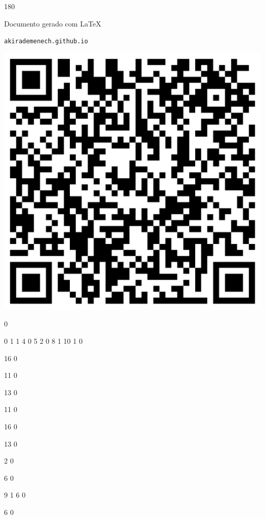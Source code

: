 \documentclass[12pt]{article}
\begin{document}
	\begin{turn}{180}	
		\begin{minipage}{\textwidth}		  
		  Documento gerado com \LaTeX			
		  
		  \texttt{akirademenech.github.io}

		  \includegraphics[height=0.3\textheight]{2e-2.pdf}

		\end{minipage}	
	\end{turn}  
		  
		\vfill  
		  
{
	0	%

	0	%
	1	%
	1	%
	4	%
	0	%
	5	%
	2	%
	0	%
	8	%
	1	%
	10	%
	1	%
	0	%

	16	%
	0	%

	11	%
	0	%

	13	%
	0	%

	11	%
	0	%

	16	%
	0	%

	13	%
	0	%

	2	%
	0	%

	6	%
	0	%

	9	%
	1	%
	6	%
	0	%

	6	%
	0	%

}	  
		    	
\end{document}
